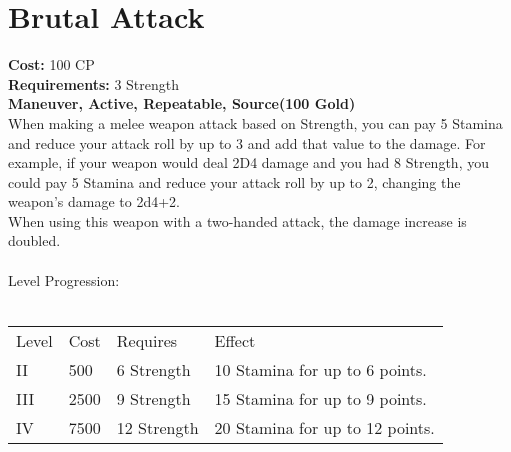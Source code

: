 \section{Brutal Attack}
\textbf{Cost:} 100 CP\\
\textbf{Requirements:} 3 Strength\\
\textbf{Maneuver, Active, Repeatable, Source(100 Gold)}\\
When making a melee weapon attack based on Strength, you can pay 5 Stamina and reduce your attack roll by up to 3 and add that value to the damage. For example, if your weapon would deal 2D4 damage and you had 8 Strength, you could pay 5 Stamina and reduce your attack roll by up to 2, changing the weapon's damage to 2d4+2.\\
When using this weapon with a two-handed attack, the damage increase is doubled.\\
\\
Level Progression:\\
\\
\begin{tabular}{l | l | l | l}
	Level & Cost & Requires & Effect\\
	II & 500 & 6 Strength & 10 Stamina for up to 6 points.\\
	III & 2500 & 9 Strength & 15 Stamina for up to 9 points.\\
	IV & 7500 & 12 Strength & 20 Stamina for up to 12 points.\\
\end{tabular}